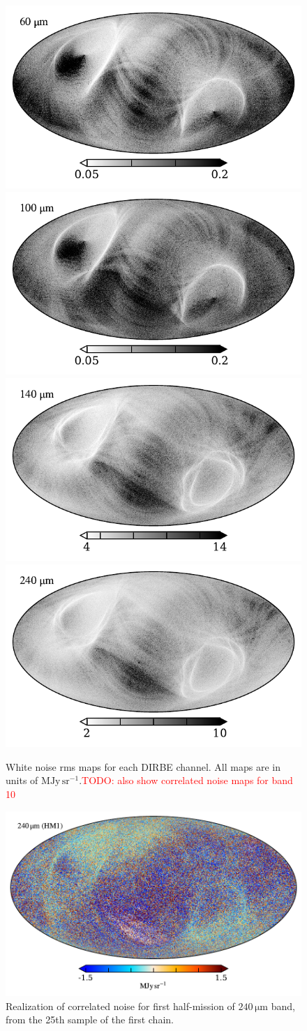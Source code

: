 \documentclass{aa}
\begin{document}
\begin{figure}
  \includegraphics[width=0.37\linewidth]{figs/rms_maps/rms_07.pdf}
  \includegraphics[width=0.37\linewidth]{figs/rms_maps/rms_08.pdf}\\       
  \includegraphics[width=0.37\linewidth]{figs/rms_maps/rms_09.pdf}
  \includegraphics[width=0.37\linewidth]{figs/rms_maps/rms_10.pdf}       
	\caption{White noise rms maps for each DIRBE channel. All maps are in units of $\mathrm{MJy\,sr^{-1}}$.\textcolor{red}{TODO: also show correlated noise maps for band 10} }
  \label{fig:sigma0_map}
\end{figure}

\begin{figure}
	\centering
	\includegraphics[width=\linewidth]{figs/ncorr_240a.pdf}
	\caption{Realization of correlated noise for first half-mission of $240\,\mathrm{\mu m}$ band, from the 25th sample of the first chain.}
\end{figure}
\end{document}
